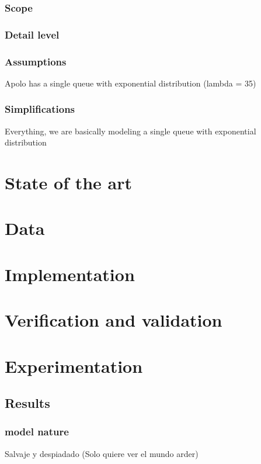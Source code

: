 \documentclass{wscpaperproc}
\begin{document}
\subsubsection{Scope}
\subsubsection{Detail level}
\subsubsection{Assumptions}

Apolo has a single queue with exponential distribution (lambda = 35)

\subsubsection{Simplifications}

Everything, we are basically modeling a single queue with exponential distribution

\section{State of the art}

\section{Data}

\section{Implementation}

\section{Verification and validation}

\section{Experimentation}

\subsection{Results}

\subsubsection{model nature} Salvaje y despiadado (Solo quiere ver el mundo arder)
\end{document}
